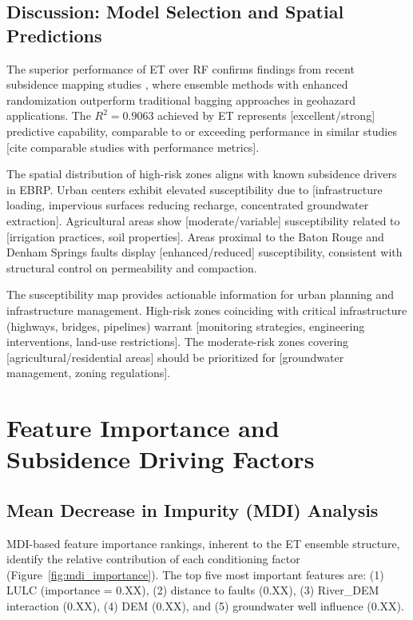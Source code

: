 \subsection{Discussion: Model Selection and Spatial Predictions}

The superior performance of ET over RF confirms findings from recent subsidence mapping studies \citep{HosseinzadehLLand2024}, where ensemble methods with enhanced randomization outperform traditional bagging approaches in geohazard applications. The $R^2 = 0.9063$ achieved by ET represents [excellent/strong] predictive capability, comparable to or exceeding performance in similar studies [cite comparable studies with performance metrics].

The spatial distribution of high-risk zones aligns with known subsidence drivers in EBRP. Urban centers exhibit elevated susceptibility due to [infrastructure loading, impervious surfaces reducing recharge, concentrated groundwater extraction]. Agricultural areas show [moderate/variable] susceptibility related to [irrigation practices, soil properties]. Areas proximal to the Baton Rouge and Denham Springs faults display [enhanced/reduced] susceptibility, consistent with structural control on permeability and compaction.

The susceptibility map provides actionable information for urban planning and infrastructure management. High-risk zones coinciding with critical infrastructure (highways, bridges, pipelines) warrant [monitoring strategies, engineering interventions, land-use restrictions]. The moderate-risk zones covering [agricultural/residential areas] should be prioritized for [groundwater management, zoning regulations].


\section{Feature Importance and Subsidence Driving Factors}

\subsection{Mean Decrease in Impurity (MDI) Analysis}

MDI-based feature importance rankings, inherent to the ET ensemble structure, identify the relative contribution of each conditioning factor (Figure~\ref{fig:mdi_importance}). The top five most important features are: (1) LULC (importance = 0.XX), (2) distance to faults (0.XX), (3) River\_DEM interaction (0.XX), (4) DEM (0.XX), and (5) groundwater well influence (0.XX).


